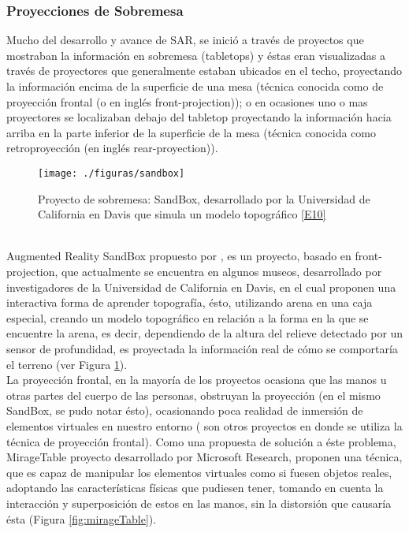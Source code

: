 \documentclass[a4paper,openright,12pt]{report}
\begin{document}
\subsubsection{Proyecciones de Sobremesa}
Mucho del desarrollo y avance de SAR, se inició a través de proyectos que mostraban la información en sobremesa (tabletops) y éstas eran visualizadas a través de proyectores que generalmente estaban ubicados en el techo, proyectando la información encima de la superficie de una mesa (técnica conocida como de proyección frontal (o en inglés front-projection)); o en ocasiones uno o mas proyectores se  localizaban debajo del tabletop proyectando la información hacia arriba en la parte inferior de la superficie de la mesa (técnica conocida como retroproyección (en inglés rear-proyection)).
\begin{figure}[th]
	\centering
	\texttt{[image: ./figuras/sandbox]}
	\caption[Proyecto de sobremesa: SandBox]{Proyecto de sobremesa: SandBox, desarrollado por la Universidad de California en Davis que simula un modelo topográfico \hyperlink{e10}{[E10]} } \label{fig:sandbox}
\end{figure}\\
Augmented Reality SandBox propuesto por \citep{kreylos2016}, es un proyecto, basado en front-projection, que actualmente se encuentra en algunos museos, desarrollado por investigadores de la Universidad de California en Davis, en el cual proponen una interactiva forma de aprender topografía, ésto, utilizando arena en una caja especial, creando un modelo topográfico en relación a la forma en la que se encuentre la arena, es decir, dependiendo de la altura del relieve detectado por un sensor de profundidad, es proyectada la información real de cómo se comportaría el terreno (ver Figura \ref{fig:sandbox}).\\
La proyección frontal, en la mayoría de los proyectos ocasiona que las manos u otras partes del cuerpo de las personas, obstruyan la proyección (en el mismo SandBox, se pudo notar ésto), ocasionando poca realidad de inmersión de elementos virtuales en nuestro entorno ( \citep{dietz2001,wilson2005,kreylos2016} son otros proyectos en donde se utiliza la técnica de proyección frontal). Como una propuesta de solución a éste problema, MirageTable \citep{benko2012} proyecto desarrollado por Microsoft Research\textregistered, proponen una técnica, que es capaz de manipular los elementos virtuales como si fuesen objetos reales, adoptando las características físicas que pudiesen tener, tomando en cuenta la interacción y superposición de estos en las manos, sin la distorsión que causaría ésta (Figura \ref{fig:mirageTable}).
\end{document}
